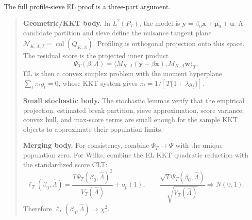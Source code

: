 \documentclass[12pt]{article}
\numberwithin{equation}{section}
\theoremstyle{definition}
\newcommand{\op}{o_p}
\newcommand{\N}{\mathcal N}
\newcommand{\LtwoT}{L^2(P_T)}
\newcommand{\innerT}[2]{\langle #1,#2\rangle_T}
\begin{document}
The full profile-sieve EL proof is a three-part argument.

\begin{quote}
\textbf{Geometric/KKT body.} In \(\LtwoT\), the model is
\(\bm y=\beta_0\bm x+\bm\mu_0+\bm u\). A candidate partition and sieve define the
nuisance tangent plane \(\N_{K,\Lambda,T}=\operatorname{col}(Q_{K,\Lambda})\).
Profiling is orthogonal projection onto this space. The residual score is the
projected inner product
\[
    \Psi_T(\beta,\Lambda)
    =\innerT{M_{K,\Lambda}(\bm y-\beta\bm x)}{M_{K,\Lambda}\bm w}.
\]
EL is then a convex simplex problem with the moment hyperplane
\(\sum_t\pi_tg_t=0\), whose KKT system gives
\(\pi_t=1/[T\{1+\lambda g_t\}]\).

\textbf{Small stochastic body.} The stochastic lemmas verify that the empirical
projection, estimated break partition, sieve approximation, score variance,
convex hull, and max-score terms are small enough for the sample KKT objects to
approximate their population limits.

\textbf{Merging body.} For consistency, combine
\(\Psi_T\to\Psi\) with the unique population zero. For Wilks, combine the EL KKT
quadratic reduction with the standardized score CLT:
\[
    \ell_T(\beta_0,\widehat\Lambda)
    =\frac{T\Psi_T(\beta_0,\widehat\Lambda)^2}{V_T(\widehat\Lambda)}+\op(1),
    \qquad
    \frac{\sqrt T\Psi_T(\beta_0,\widehat\Lambda)}
         {\sqrt{V_T(\widehat\Lambda)}}\Rightarrow N(0,1).
\]
Therefore \(\ell_T(\beta_0,\widehat\Lambda)\Rightarrow\chi_1^2\).
\end{quote}
\end{document}
